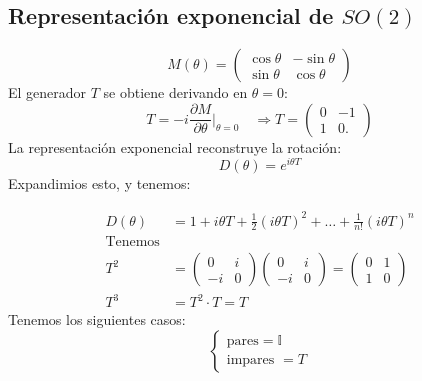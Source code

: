 \documentclass[a4paper,12pt]{article}
\begin{document}


\subsection{Representación exponencial de $SO(2)$}

\[
M(\theta) = \begin{pmatrix}
    \cos \theta &-\sin\theta \\
    \sin\theta & \cos\theta
\end{pmatrix}
\]
El generador $T$ se obtiene derivando en $\theta=0$:
\[
T = - i \frac{\partial M}{ \partial \theta }\big|_{\theta =0 } \quad \Rightarrow T = \begin{pmatrix}
    0 & -1\\
    1 &0 .
\end{pmatrix}
\]
La representación exponencial reconstruye la rotación:
\[
D(\theta) = e^{ i \theta T}
\]
Expandimios esto, y tenemos: 

\begin{align*}
D(\theta  ) &= 1+ i\theta T+ \frac{1}{2} (i\theta T)^2+\ldots + \frac{1}{n!} (i \theta T)^n\\
\text{Tenemos} \\
T^2 &= \begin{pmatrix}
    0 &i\\
    -i&0
\end{pmatrix}\begin{pmatrix}
    0 &i\\
    -i&0
\end{pmatrix} = \begin{pmatrix}
    0 &1\\
    1&0
\end{pmatrix}\\
T^3&= T^2 \cdot T = T 
\end{align*}
Tenemos los siguientes casos: 
\[
 \begin{cases}
     \text{pares} = \mathbb{I} \\
     \text{impares } = T
 \end{cases}
\]
\end{document}
